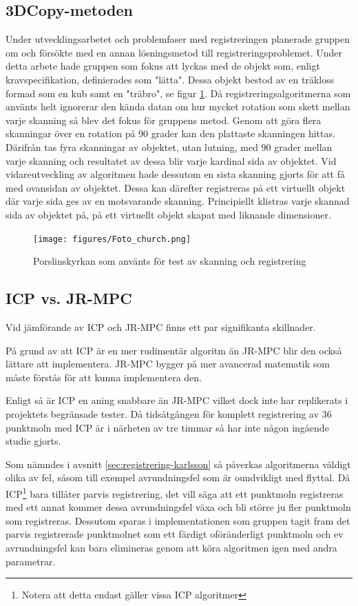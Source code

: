 \subsection{3DCopy-metoden}
Under utvecklingsarbetet och problemfaser med registreringen planerade gruppen om och försökte med en annan lösningsmetod till registreringsproblemet. Under detta arbete hade gruppen som fokus att lyckas med de objekt som, enligt kravspecifikation, definierades som "lätta". Dessa objekt bestod av en träkloss formad som en kub samt en "träbro", se figur \ref{fig:foto_church}. Då registreringsalgoritmerna som använts helt ignorerar den kända datan om hur mycket rotation som skett mellan varje skanning så blev det fokus för gruppens metod. Genom att göra flera skanningar över en rotation på 90 grader kan den plattaste skanningen hittas. Därifrån tas fyra skanningar av objektet, utan lutning, med 90 grader mellan varje skanning och resultatet av dessa blir varje kardinal sida av objektet. Vid vidareutveckling av algoritmen hade dessutom en sista skanning gjorts för att få med ovansidan av objektet. Dessa kan därefter registreras på ett virtuellt objekt där varje sida ges av en motsvarande skanning. Principiellt klistras varje skannad sida av objektet på, på ett virtuellt objekt skapat med liknande dimensioner. 

\begin{figure}[H]
	\centering
	\texttt{[image: figures/Foto\_church.png]}
	\caption{Porslinskyrkan som använts för test av skanning och registrering}
	\label{fig:foto_church}
\end{figure}

\subsection{ICP vs. JR-MPC}

Vid jämförande av ICP och JR-MPC finns ett par signifikanta skillnader. 

På grund av att ICP är en mer rudimentär algoritm än JR-MPC blir den också lättare att implementera. JR-MPC bygger på mer avancerad matematik som måste förstås för att kunna implementera den.

Enligt \cite{Evangelidis-ECCV-2014} så är ICP en aning snabbare än JR-MPC vilket dock inte har replikerats i projektets begränsade tester. Då tidsåtgången för komplett registrering av 36 punktmoln med ICP är i närheten av tre timmar så har inte någon ingående studie gjorts. 

Som nämndes i avsnitt \ref{sec:registrering-karlsson} så påverkas algoritmerna väldigt olika av fel, såsom till exempel avrundningsfel som är oundvikligt med flyttal. Då ICP\footnote{Notera att detta endast gäller vissa ICP algoritmer} bara tillåter parvis registrering, det vill säga att ett punktmoln registreras med ett annat kommer dessa avrundningsfel växa och bli större ju fler punktmoln som registreras. Dessutom sparas i implementationen som gruppen tagit fram det parvis registrerade punktmolnet som ett färdigt oföränderligt punktmoln och ev avrundningsfel kan bara elimineras genom att köra algoritmen igen med andra parametrar.

